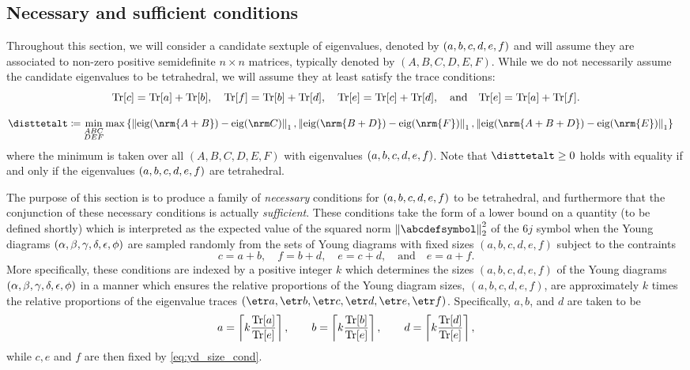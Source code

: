 \documentclass[notitlepage, 10pt]{article}
\begin{document}
\subsection{Necessary and sufficient conditions}

Throughout this section, we will consider a candidate sextuple of eigenvalues, denoted by $(a,b,c,d,e,f)$ and will assume they are associated to non-zero positive semidefinite $n\times n$ matrices, typically denoted by $(A,B,C,D,E,F)$.
While we do not necessarily assume the candidate eigenvalues to be tetrahedral, we will assume they at least satisfy the trace conditions:
\begin{equation}
    \label{eq:tet_eig_trace_cond}
    {\operatorname{Tr}[c]} = {\operatorname{Tr}[a]} + {\operatorname{Tr}[b]}, \quad
    {\operatorname{Tr}[f]} = {\operatorname{Tr}[b]} + {\operatorname{Tr}[d]}, \quad
    {\operatorname{Tr}[e]} = {\operatorname{Tr}[c]} + {\operatorname{Tr}[d]}, \quad \text{and} \quad
    {\operatorname{Tr}[e]} = {\operatorname{Tr}[a]} + {\operatorname{Tr}[f]}.
\end{equation}

\begin{align}
    \disttetalt
    &\coloneqq \min_{\substack{ABC\\DEF}} \max\left\{\norm{\eig(\nrm{A+B})-\eig(\nrm C)}_1, \norm{\eig(\nrm{B+D})-\eig(\nrm{F})}_1, \norm{\eig(\nrm{A+B+D})-\eig(\nrm{E})}_1\right\}
\end{align}
where the minimum is taken over all $(A,B,C,D,E,F)$ with eigenvalues $(a,b,c,d,e,f)$.
Note that $\disttetalt \geq 0$ holds with equality if and only if the eigenvalues $(a,b,c,d,e,f)$ are tetrahedral.

The purpose of this section is to produce a family of \textit{necessary} conditions for $(a,b,c,d,e,f)$ to be tetrahedral, and furthermore that the conjunction of these necessary conditions is actually \textit{sufficient}.
These conditions take the form of a lower bound on a quantity (to be defined shortly) which is interpreted as the expected value of the squared norm $\norm{\abcdefsymbol}_2^2$ of the $6j$ symbol when the Young diagrams $(\alpha, \beta, \gamma, \delta, \epsilon, \phi)$ are sampled randomly from the sets of Young diagrams with fixed sizes $(a,b,c,d,e,f)$ subject to the contraints 
\begin{equation}
    \label{eq:yd_size_cond}
    c=a+b, \quad f=b+d, \quad e=c+d, \quad \text{and} \quad e=a+f.
\end{equation}
More specifically, these conditions are indexed by a positive integer $k$ which determines the sizes $(a,b,c,d,e,f)$ of the Young diagrams $(\alpha,\beta,\gamma,\delta,\epsilon,\phi)$ in a manner which ensures the relative proportions of the Young diagram sizes, $(a,b,c,d,e,f)$, are approximately $k$ times the relative proportions of the eigenvalue traces $(\etr \ea, \etr \eb, \etr \ec, \etr \ed, \etr \ee, \etr \ef)$.
Specifically, $a,b$, and $d$ are taken to be
\begin{equation}
    \label{eq:yd_ceil_cond}
    a = \left\lceil k\frac{{\operatorname{Tr}[a]}}{{\operatorname{Tr}[e]}}\right\rceil, \qquad
    b = \left\lceil k\frac{{\operatorname{Tr}[b]}}{{\operatorname{Tr}[e]}}\right\rceil, \qquad
    d = \left\lceil k\frac{{\operatorname{Tr}[d]}}{{\operatorname{Tr}[e]}}\right\rceil,
\end{equation}
while $c,e$ and $f$ are then fixed by \cref{eq:yd_size_cond}.
\end{document}
